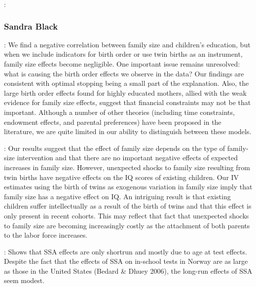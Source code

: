 \documentclass[11pt,a4paper,twoside]{article}
\begin{document}
\cite{behrman_parental_1982}: 

\cite{behrman_chapter_1997}

\cite{behrman_parental_2022}

\cite{conti_parental_2022}

\cite{bharadwaj_health_2018}

\cite{rosenzweig_heterogeneity_1988}

\cite{cunha_technology_2007}

\cite{yi_early_2015}

\cite{giannola_parental_2024}

\subsubsection{Sandra Black}
\cite{black_more_2005}: We find a negative correlation between family size and children’s education, but when we include indicators for birth order or use twin births as an instrument, family size effects become negligible. One important issue remains unresolved: what is causing the birth order effects we observe in the data? Our findings are consistent with optimal stopping being a small part of the explanation. Also, the large birth order effects found for highly educated mothers, allied with the weak evidence for family size effects, suggest that financial constraints may not be that important. Although a number of other theories (including time constraints, endowment effects, and parental preferences) have been proposed in the literature, we are quite limited in our ability to distinguish between these models.


\cite{black_small_2010}: Our results suggest that the effect of family size depends on the type of family-size intervention and that there are no important negative effects of expected increases in family size. However, unexpected shocks to family size resulting from twin births have negative effects on the IQ scores of existing children. Our IV estimates using the birth of twins as exogenous variation in family size imply that family size has a negative effect on IQ. An intriguing result is that existing children suffer intellectually as a result of the birth of twins and that this effect is only present in recent cohorts. This may reflect that fact that unexpected shocks to family size are becoming increasingly costly as the attachment of both parents to the labor force increases.

\cite{black_too_2011}: Shows that SSA effects are only shortrun and mostly due to age at test effects. Despite the fact that the effects of SSA on in-school tests in Norway are as large as those in the United States (Bedard & Dhuey 2006), the long-run effects of SSA seem modest.
\end{document}
